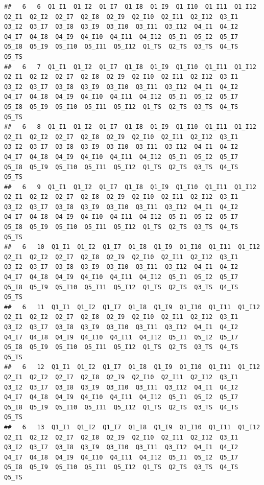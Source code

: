 \documentclass[
]{book}
\begin{document}
\begin{verbatim}
##   6   6  Q1_I1  Q1_I2  Q1_I7  Q1_I8  Q1_I9  Q1_I10  Q1_I11  Q1_I12  Q2_I1  Q2_I2  Q2_I7  Q2_I8  Q2_I9  Q2_I10  Q2_I11  Q2_I12  Q3_I1  Q3_I2  Q3_I7  Q3_I8  Q3_I9  Q3_I10  Q3_I11  Q3_I12  Q4_I1  Q4_I2  Q4_I7  Q4_I8  Q4_I9  Q4_I10  Q4_I11  Q4_I12  Q5_I1  Q5_I2  Q5_I7  Q5_I8  Q5_I9  Q5_I10  Q5_I11  Q5_I12  Q1_TS  Q2_TS  Q3_TS  Q4_TS  Q5_TS
##   6   7  Q1_I1  Q1_I2  Q1_I7  Q1_I8  Q1_I9  Q1_I10  Q1_I11  Q1_I12  Q2_I1  Q2_I2  Q2_I7  Q2_I8  Q2_I9  Q2_I10  Q2_I11  Q2_I12  Q3_I1  Q3_I2  Q3_I7  Q3_I8  Q3_I9  Q3_I10  Q3_I11  Q3_I12  Q4_I1  Q4_I2  Q4_I7  Q4_I8  Q4_I9  Q4_I10  Q4_I11  Q4_I12  Q5_I1  Q5_I2  Q5_I7  Q5_I8  Q5_I9  Q5_I10  Q5_I11  Q5_I12  Q1_TS  Q2_TS  Q3_TS  Q4_TS  Q5_TS
##   6   8  Q1_I1  Q1_I2  Q1_I7  Q1_I8  Q1_I9  Q1_I10  Q1_I11  Q1_I12  Q2_I1  Q2_I2  Q2_I7  Q2_I8  Q2_I9  Q2_I10  Q2_I11  Q2_I12  Q3_I1  Q3_I2  Q3_I7  Q3_I8  Q3_I9  Q3_I10  Q3_I11  Q3_I12  Q4_I1  Q4_I2  Q4_I7  Q4_I8  Q4_I9  Q4_I10  Q4_I11  Q4_I12  Q5_I1  Q5_I2  Q5_I7  Q5_I8  Q5_I9  Q5_I10  Q5_I11  Q5_I12  Q1_TS  Q2_TS  Q3_TS  Q4_TS  Q5_TS
##   6   9  Q1_I1  Q1_I2  Q1_I7  Q1_I8  Q1_I9  Q1_I10  Q1_I11  Q1_I12  Q2_I1  Q2_I2  Q2_I7  Q2_I8  Q2_I9  Q2_I10  Q2_I11  Q2_I12  Q3_I1  Q3_I2  Q3_I7  Q3_I8  Q3_I9  Q3_I10  Q3_I11  Q3_I12  Q4_I1  Q4_I2  Q4_I7  Q4_I8  Q4_I9  Q4_I10  Q4_I11  Q4_I12  Q5_I1  Q5_I2  Q5_I7  Q5_I8  Q5_I9  Q5_I10  Q5_I11  Q5_I12  Q1_TS  Q2_TS  Q3_TS  Q4_TS  Q5_TS
##   6   10  Q1_I1  Q1_I2  Q1_I7  Q1_I8  Q1_I9  Q1_I10  Q1_I11  Q1_I12  Q2_I1  Q2_I2  Q2_I7  Q2_I8  Q2_I9  Q2_I10  Q2_I11  Q2_I12  Q3_I1  Q3_I2  Q3_I7  Q3_I8  Q3_I9  Q3_I10  Q3_I11  Q3_I12  Q4_I1  Q4_I2  Q4_I7  Q4_I8  Q4_I9  Q4_I10  Q4_I11  Q4_I12  Q5_I1  Q5_I2  Q5_I7  Q5_I8  Q5_I9  Q5_I10  Q5_I11  Q5_I12  Q1_TS  Q2_TS  Q3_TS  Q4_TS  Q5_TS
##   6   11  Q1_I1  Q1_I2  Q1_I7  Q1_I8  Q1_I9  Q1_I10  Q1_I11  Q1_I12  Q2_I1  Q2_I2  Q2_I7  Q2_I8  Q2_I9  Q2_I10  Q2_I11  Q2_I12  Q3_I1  Q3_I2  Q3_I7  Q3_I8  Q3_I9  Q3_I10  Q3_I11  Q3_I12  Q4_I1  Q4_I2  Q4_I7  Q4_I8  Q4_I9  Q4_I10  Q4_I11  Q4_I12  Q5_I1  Q5_I2  Q5_I7  Q5_I8  Q5_I9  Q5_I10  Q5_I11  Q5_I12  Q1_TS  Q2_TS  Q3_TS  Q4_TS  Q5_TS
##   6   12  Q1_I1  Q1_I2  Q1_I7  Q1_I8  Q1_I9  Q1_I10  Q1_I11  Q1_I12  Q2_I1  Q2_I2  Q2_I7  Q2_I8  Q2_I9  Q2_I10  Q2_I11  Q2_I12  Q3_I1  Q3_I2  Q3_I7  Q3_I8  Q3_I9  Q3_I10  Q3_I11  Q3_I12  Q4_I1  Q4_I2  Q4_I7  Q4_I8  Q4_I9  Q4_I10  Q4_I11  Q4_I12  Q5_I1  Q5_I2  Q5_I7  Q5_I8  Q5_I9  Q5_I10  Q5_I11  Q5_I12  Q1_TS  Q2_TS  Q3_TS  Q4_TS  Q5_TS
##   6   13  Q1_I1  Q1_I2  Q1_I7  Q1_I8  Q1_I9  Q1_I10  Q1_I11  Q1_I12  Q2_I1  Q2_I2  Q2_I7  Q2_I8  Q2_I9  Q2_I10  Q2_I11  Q2_I12  Q3_I1  Q3_I2  Q3_I7  Q3_I8  Q3_I9  Q3_I10  Q3_I11  Q3_I12  Q4_I1  Q4_I2  Q4_I7  Q4_I8  Q4_I9  Q4_I10  Q4_I11  Q4_I12  Q5_I1  Q5_I2  Q5_I7  Q5_I8  Q5_I9  Q5_I10  Q5_I11  Q5_I12  Q1_TS  Q2_TS  Q3_TS  Q4_TS  Q5_TS

\end{verbatim}
\end{document}
